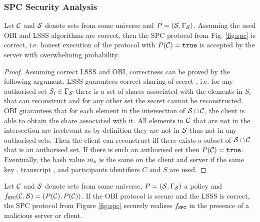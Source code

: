 \subsubsection{SPC Security Analysis}
\begin{lemma}[Correctness]\label{lem:correct}
  Let $\mathcal{C}$ and $\mathcal{S}$ denote sets from some universe and $P=(\mathcal{S},\Gamma_\mathcal{S})$.
  Assuming the used OBI and LSSS algorithms are correct, then the SPC protocol from Fig. \ref{fig:spc} is correct, i.e. honest execution of the protocol with $P(\mathcal{C}) = \mathtt{true}$ is accepted by the server with overwhelming probability.\end{lemma}
\begin{proof}
Assuming correct LSSS and OBI, correctness can be proved by the following argument.
LSSS guarantees correct sharing of secret \secret, i.e. for any authorised set $S_i\in \Gamma_\mathcal{S}$ there is a set of shares associated with the elements in $S_i$ that can reconstruct \secret and for any other set the secret cannot be reconstructed. 
OBI guarantees that for each element in the intersection of $\mathcal{S}\cap \mathcal{C}$, the client is able to obtain the share associated with it. 
All elements in $\mathcal{C}$ that are not in the intersection are irrelevant as by definition they are not in $\mathcal{S}$ thus not in any authorised sets. Then the client can reconstruct \secret iff there exists a subset of $\mathcal{S}\cap \mathcal{C}$ that is an authorised set. 
If there is such an authorised set then $P(\mathcal{C})=\mathtt{true}$. Eventually, the hash value $m_\mathfrak{s}$ is the same on the client and server if the same key \secret, transcript \trans, and participants identifiers $C$ and $S$ are used.

\end{proof}

\begin{lemma}[Privacy]\label{lem:SPCprivacy}
 Let $\mathcal{C}$ and $\mathcal{S}$ denote sets from some universe, $P=(\mathcal{S},\Gamma_\mathcal{S})$ a policy and $f_\mathtt{SPC}(\mathcal{C}, \mathcal{S})=(P(\mathcal{C}), P(\mathcal{C}))$. If the OBI protocol is secure and the LSSS is correct, the SPC protocol from Figure \ref{fig:spc} securely realises $f_\mathtt{SPC}$ in the presence of a malicious server or client.
\end{lemma}

